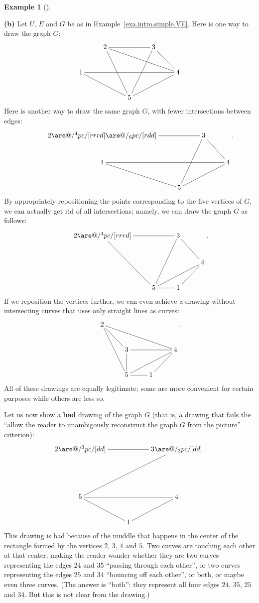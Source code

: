 \documentclass[numbers=enddot,12pt,final,onecolumn,notitlepage]{scrartcl}%
\makeatletter
\theoremstyle{definition}
\newtheorem{exam}[theo]{Example}
\newenvironment{example}[1][]
{\begin{exam}[#1]\begin{leftbar}}
{\end{leftbar}\end{exam}}
\newcommand{\are}{\ar@{-}}
\makeatother
\begin{document}
\begin{example}
\textbf{(b)} Let $U$, $E$ and $G$ be as in
Example~\ref{exa.intro.simple.VE}. Here is one way to draw the graph
$G$:
\begin{align*}
\xymatrix{
& 2 \are[rr] \are[rrrd] \are[rdd] & & 3 \are[rd] \are[ldd] \\
1 \are[rrrr] \are[rrd] & & & & 4 \are[lld] \\
& & 5
}
\end{align*}
Here is another way to draw the same graph $G$, with fewer
intersections between edges:
\begin{align*}
\xymatrix{
& 2 \are[rr] \are@/^4pc/[rrrd] \are@/_6pc/[rdd] & & 3 \are[rd] \are[ldd] \\
& 1 \are[rrr] \are[rd] & & & 4 \are[lld] \\
& & 5
} .
\end{align*}
By appropriately repositioning the points corresponding to the five
vertices of $G$, we can actually get rid of all intersections; namely,
we can draw the graph $G$ as follows:
\begin{align*}
\xymatrix{
& 2 \are[rr] \are@/^4pc/[rrrd] \are[rdd] & & 3 \are[rd] \are[ldd] \\
& & & & 4 \are[lld] \\
& & 5 \are[r] & 1 \are[ru]
} .
\end{align*}
If we reposition the vertices further, we can even achieve a drawing
without intersecting curves that uses only straight lines as curves:
\begin{align*}
\xymatrix{
& 2 \are[rd] \are[rrrd] \are[rdd] \\
& & 3 \are[d] \are[rr] & & 4 \are[lld] \\
& & 5 \are[r] & 1 \are[ru]
} .
\end{align*}
All of these drawings are equally legitimate; some are more convenient
for certain purposes while others are less so.

Let us now show a \textbf{bad} drawing of the graph $G$ (that is, a
drawing that fails the ``allow the reader to
unambigously reconstruct the graph $G$ from the picture'' criterion):
\begin{align*}
\xymatrix{
2 \are[rr] \are@/^3pc/[dd] & & 3 \are@/_3pc/[dd] \are[lldd] \\
& \\
5 \are[rr] \are[rd] & & 4 \are[ld] \\
& 1
} .
\end{align*}
This drawing is bad because of the muddle that happens in the center
of the rectangle formed by the vertices $2$, $3$, $4$ and $5$. Two
curves are touching each other at that center, making the reader
wonder whether they are two curves representing the edges $24$ and
$35$ ``passing through each other'', or two curves representing the
edges $25$ and $34$ ``bouncing off each other'', or both, or maybe
even three curves. (The answer is ``both'': they represent all four
edges $24$, $35$, $25$ and $34$. But this is not clear from the
drawing.)


\end{example}
\end{document}
